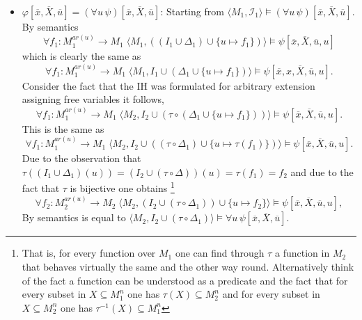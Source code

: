 \documentclass[11pt,a4paper]{article}
\begin{document}
\begin{itemize}[leftmargin=*]
\item  $\varphi[\overline{x}, \overline{X}, \overline{u}] = (\forall u \, \psi)[\overline{x}, \overline{X}, \overline{u}]$: Starting from $\langle M_1, \mathcal{I}_1 \rangle \models (\forall u \, \psi)[\overline{x}, \overline{X}, \overline{u}]$. By semantics  
\begin{equation*}
\forall f_1 : M_1^{ar(u)} \to M_1 \; \langle M_1 , ((I_1 \cup \Delta_1) \cup \{u \mapsto f_1\}) \rangle \models \psi[\overline{x}, \overline{X}, \overline{u}, u]
\end{equation*}
which is clearly the same as
\begin{equation*}
\forall f_1 : M_1^{ar(u)} \to M_1 \; \langle M_1 , I_1 \cup (\Delta_1 \cup \{u \mapsto f_1\}) \rangle \models \psi[\overline{x},x, \overline{X}, \overline{u}, u].
\end{equation*}
Consider the fact that the IH was formulated for arbitrary extension assigning free variables it follows,
 \begin{equation*}
\forall   f_1 : M_1^{ar(u)} \to M_1 \;  \langle M_2 , I_2 \cup (\tau \circ (\Delta_1 \cup \{u \mapsto f_1\})) \rangle \models \psi[\overline{x}, \overline{X}, \overline{u}, u].
\end{equation*} 
This is the same as 
\begin{equation*}
\forall  f_1 : M_1^{ar(u)} \to M_1 \;  \langle M_2 , I_2 \cup ((\tau \circ \Delta_1) \cup \{u \mapsto \tau(f_1)\}) \rangle \models \psi[\overline{x}, \overline{X}, \overline{u}, u].
\end{equation*}
Due to the observation that $\tau((I_1 \cup \Delta_1)(u))=(I_2 \cup (\tau \circ \Delta))(u)=\tau(f_1)=f_2$ and due to the fact that $\tau$ is bijective one obtains \footnote{That is, for every function over $M_1$ one can find through $\tau$ a function in $M_2$ that behaves virtually the same and the other way round. Alternatively think of the fact a function can be understood as a predicate and the fact that for every subset in $X \subseteq M_1^n$ one has $\tau(X) \subseteq M_2^n$ and for every subset in $X \subseteq M_2^n$ one has $\tau^{-1}(X) \subseteq M_1^n$ }
\begin{equation*}
\forall  f_2 : M_2^{ar(u)} \to M_2 \;  \langle M_2 , (I_2 \cup (\tau \circ \Delta_1)) \cup \{u \mapsto f_2 \} \rangle \models \psi[\overline{x}, \overline{X}, \overline{u}, u],
\end{equation*}
By semantics is equal to $\langle M_2 , I_2 \cup (\tau \circ \Delta_1)\rangle \models \forall u \, \psi[\overline{x}, \overline{X}, \overline{u}]$. \\




\end{itemize}
\end{document}
